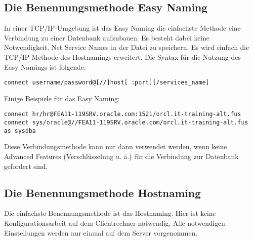       \subsection{Die Benennungsmethode Easy Naming}
        In einer TCP/IP-Umgebung ist das Easy Naming die einfachste Methode eine Verbindung zu einer Datenbank aufzubauen. Es besteht dabei keine Notwendigkeit, Net Service Names in der Datei  zu speichern. Es wird einfach die TCP/IP-Methode des Hostnamings erweitert. Die Syntax f\"ur die Nutzung des Easy Namings ist folgende:
        \begin{lstlisting}[caption={Easy Naming},label=admin606,language=terminal]
connect username/password@[//]host[ :port][/services_name]
        \end{lstlisting}
        Einige Beispiele f\"ur das Easy Naming:
        \begin{lstlisting}[caption={Beispiele f\"ur Easy Naming},label=admin607,language=terminal]
connect hr/hr@FEA11-119SRV.oracle.com:1521/orcl.it-training-alt.fus
connect sys/oracle@//FEA11-119SRV.oracle.com/orcl.it-training-alt.fus as sysdba
        \end{lstlisting}
        \begin{merke}
          Diese Verbindungsmethode kann nur dann verwendet werden, wenn keine Advanced Features (Verschl\"usselung u. \"a.) f\"ur die Verbindung zur Datenbank gefordert sind.
        \end{merke}
        \begin{literaturinternet}
          \item \cite{i507143}
        \end{literaturinternet}
      \subsection{Die Benennungsmethode Hostnaming}
        Die einfachste Benennungsmethode ist das Hostnaming. Hier ist keine Konfigurationsarbeit auf dem Clientrechner notwendig. Alle notwendigen Einstellungen werden nur einmal auf dem Server vorgenommen.

